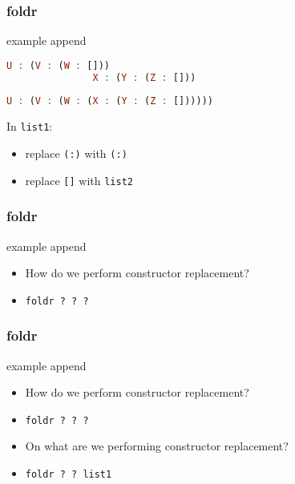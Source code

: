 \begin{frame}[fragile]
\frametitle{foldr}

\begin{block}{example \textemdash append}

\begin{lstlisting}[language=haskell]
U : (V : (W : []))
               X : (Y : (Z : []))
               
U : (V : (W : (X : (Y : (Z : [])))))
\end{lstlisting}

\end{block}

In \lstinline[basicstyle=\ttfamily]$list1$:
\begin{itemize}
\item replace \lstinline[basicstyle=\ttfamily]$(:)$ with \lstinline[basicstyle=\ttfamily]$(:)$
\item replace \lstinline[basicstyle=\ttfamily]$[]$ with \lstinline[basicstyle=\ttfamily]$list2$
\end{itemize}

\end{frame}


\begin{frame}
\frametitle{foldr}

\begin{block}{example \textemdash append}

\begin{itemize}
\item How do we perform constructor replacement?
\item \lstinline[basicstyle=\ttfamily]$foldr ? ? ?$
\end{itemize}

\end{block}

\end{frame}


\begin{frame}
\frametitle{foldr}

\begin{block}{example \textemdash append}

\begin{itemize}
\item How do we perform constructor replacement?
\item \lstinline[basicstyle=\ttfamily]$foldr ? ? ?$
\item On what are we performing constructor replacement?
\item \lstinline[basicstyle=\ttfamily]$foldr ? ? list1$
\end{itemize}

\end{block}

\end{frame}


